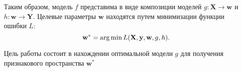 \documentclass[12pt,twoside]{article}
\begin{document}
Таким образом, модель $f$ представима в виде композиции моделей $g: \mathbf{X} \to \mathbf{w}$ и $h: \mathbf{w} \to \mathbf{Y}$. Целевые параметры $\mathbf{w}$ находятся путем минимизации функции ошибки $L$:
\begin{equation}
	\mathbf{w^*} = \argmin L(\mathbf{X}, \mathbf{y}, \mathbf{w}, g, h).
\end{equation}

Цель работы состоит в нахождении оптимальной модели $g$ для получения признакового пространства $\mathbf{w^*}$





\end{document}
